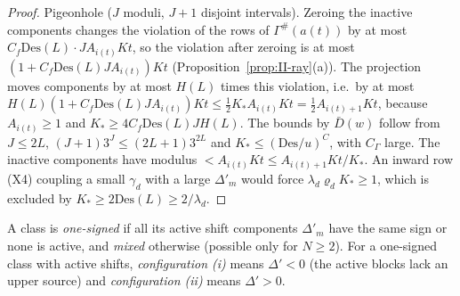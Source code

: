 \documentclass[10pt]{amsart}
\theoremstyle{definition}
\theoremstyle{remark}
\begin{document}
\begin{proof}
Pigeonhole ($J$ moduli, $J+1$ disjoint intervals).  Zeroing the inactive
components changes the violation of the rows of $\Gamma^\#(a(t))$ by at
most $C_f\mathrm{Des}(L)\cdot JA_{i(t)}Kt$, so the violation after zeroing is
at most $(1+C_f\mathrm{Des}(L)JA_{i(t)})Kt$ (Proposition~\ref{prop:II-ray}(a)).
The projection moves components by at most $H(L)$ times this violation,
i.e.\ by at most $H(L)(1+C_f\mathrm{Des}(L)JA_{i(t)})Kt\le\frac12K_*A_{i(t)}
Kt=\frac12A_{i(t)+1}Kt$, because $A_{i(t)}\ge1$ and $K_*\ge4C_f\mathrm{Des}
(L)JH(L)$.  The bounds by $\bar D(w)$ follow from $J\le2L$, $(J+1)3^J\le
(2L+1)3^{2L}$ and $K_*\le(\mathrm{Des}/u)^C$, with $C_\Gamma$ large.  The
inactive components have modulus $<A_{i(t)}Kt\le A_{i(t)+1}Kt/K_*$.  An inward row
(X4) coupling a small $\gamma_d$ with a large $\Delta'_m$ would force $\lambda_d\varrho_d
K_*\ge1$, which is excluded by $K_*\ge2\mathrm{Des}(L)\ge2/\lambda_d$.
\end{proof}

A class is \emph{one-signed} if all its active shift components $\Delta'_m$ have
the same sign or none is active, and \emph{mixed} otherwise (possible only for
$N\ge2$).  For a one-signed class with active shifts, \emph{configuration (i)}
means $\Delta'<0$ (the active blocks lack an upper source) and
\emph{configuration (ii)} means $\Delta'>0$.
\end{document}
